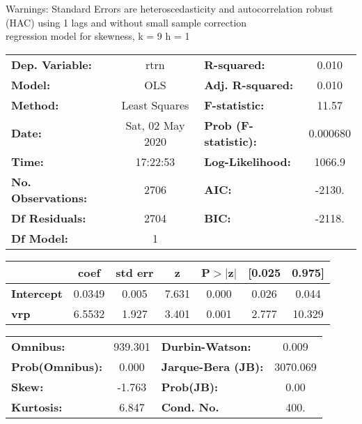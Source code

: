 Warnings: \newline
 [1] Standard Errors are heteroscedasticity and autocorrelation robust (HAC) using 1 lags and without small sample correction\\ 

regression model for skewness, k = 9 h = 1\begin{center}
\begin{tabular}{lclc}
\toprule
\textbf{Dep. Variable:}    &       rtrn       & \textbf{  R-squared:         } &     0.010   \\
\textbf{Model:}            &       OLS        & \textbf{  Adj. R-squared:    } &     0.010   \\
\textbf{Method:}           &  Least Squares   & \textbf{  F-statistic:       } &     11.57   \\
\textbf{Date:}             & Sat, 02 May 2020 & \textbf{  Prob (F-statistic):} &  0.000680   \\
\textbf{Time:}             &     17:22:53     & \textbf{  Log-Likelihood:    } &    1066.9   \\
\textbf{No. Observations:} &        2706      & \textbf{  AIC:               } &    -2130.   \\
\textbf{Df Residuals:}     &        2704      & \textbf{  BIC:               } &    -2118.   \\
\textbf{Df Model:}         &           1      & \textbf{                     } &             \\
\bottomrule
\end{tabular}
\begin{tabular}{lcccccc}
                   & \textbf{coef} & \textbf{std err} & \textbf{z} & \textbf{P$> |$z$|$} & \textbf{[0.025} & \textbf{0.975]}  \\
\midrule
\textbf{Intercept} &       0.0349  &        0.005     &     7.631  &         0.000        &        0.026    &        0.044     \\
\textbf{vrp}       &       6.5532  &        1.927     &     3.401  &         0.001        &        2.777    &       10.329     \\
\bottomrule
\end{tabular}
\begin{tabular}{lclc}
\textbf{Omnibus:}       & 939.301 & \textbf{  Durbin-Watson:     } &    0.009  \\
\textbf{Prob(Omnibus):} &   0.000 & \textbf{  Jarque-Bera (JB):  } & 3070.069  \\
\textbf{Skew:}          &  -1.763 & \textbf{  Prob(JB):          } &     0.00  \\
\textbf{Kurtosis:}      &   6.847 & \textbf{  Cond. No.          } &     400.  \\
\bottomrule
\end{tabular}
\end{center}

